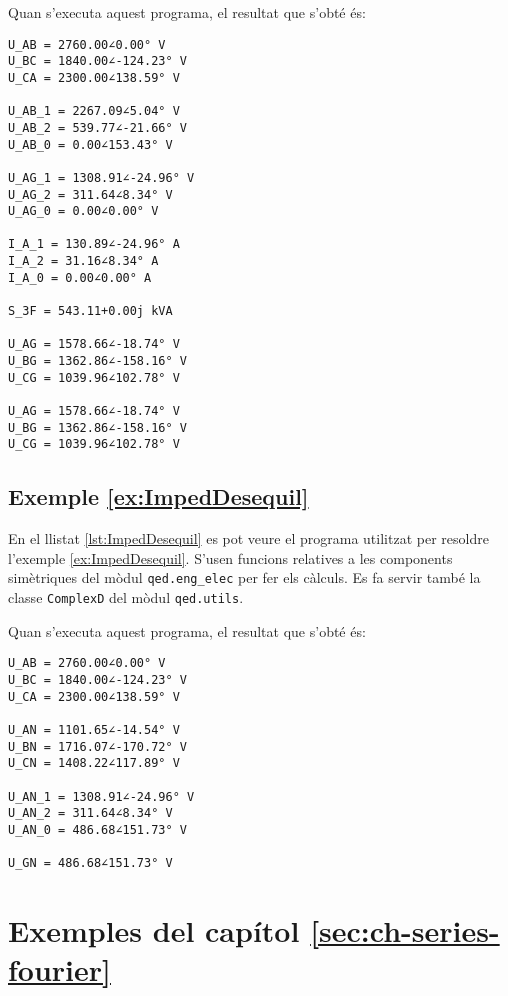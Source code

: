 Quan s'executa aquest programa, el resultat que s'obté és:
\lstset{
	language=,
	numbers=none,
	frame=none
}
\begin{lstlisting}
U_AB = 2760.00∠0.00° V
U_BC = 1840.00∠-124.23° V
U_CA = 2300.00∠138.59° V

U_AB_1 = 2267.09∠5.04° V
U_AB_2 = 539.77∠-21.66° V
U_AB_0 = 0.00∠153.43° V

U_AG_1 = 1308.91∠-24.96° V
U_AG_2 = 311.64∠8.34° V
U_AG_0 = 0.00∠0.00° V

I_A_1 = 130.89∠-24.96° A
I_A_2 = 31.16∠8.34° A
I_A_0 = 0.00∠0.00° A

S_3F = 543.11+0.00j kVA

U_AG = 1578.66∠-18.74° V
U_BG = 1362.86∠-158.16° V
U_CG = 1039.96∠102.78° V

U_AG = 1578.66∠-18.74° V
U_BG = 1362.86∠-158.16° V
U_CG = 1039.96∠102.78° V
\end{lstlisting}


\hypertarget{exemple:ImpedDesequil}{\subsection{Exemple \ref*{ex:ImpedDesequil} \ImpedDesequil}}
En el llistat \vref{lst:ImpedDesequil} es pot veure el programa utilitzat per resoldre l'exemple \vref{ex:ImpedDesequil}. S'usen funcions relatives a les components simètriques del mòdul \texttt{qed.eng\_elec} per fer els càlculs. Es fa servir també la classe \texttt{ComplexD} del mòdul \texttt{qed.utils}.


Quan s'executa aquest programa, el resultat que s'obté és:
\lstset{
	language=,
	numbers=none,
	frame=none
}
\begin{lstlisting}
U_AB = 2760.00∠0.00° V
U_BC = 1840.00∠-124.23° V
U_CA = 2300.00∠138.59° V

U_AN = 1101.65∠-14.54° V
U_BN = 1716.07∠-170.72° V
U_CN = 1408.22∠117.89° V

U_AN_1 = 1308.91∠-24.96° V
U_AN_2 = 311.64∠8.34° V
U_AN_0 = 486.68∠151.73° V

U_GN = 486.68∠151.73° V
\end{lstlisting}




\section{Exemples del capítol \ref*{sec:ch-series-fourier}}

